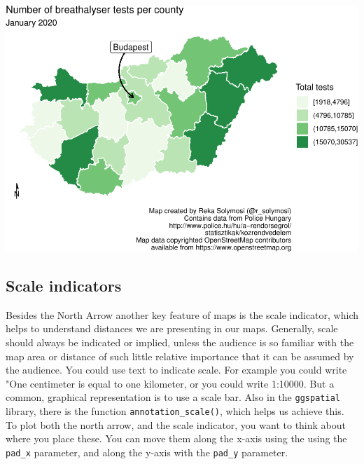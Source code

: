 \documentclass[
]{book}
\begin{document}
\includegraphics{crime_mapping_files/figure-latex/orientationarrowstyle-1.pdf}

\hypertarget{scale-indicators}{%
\subsection{Scale indicators}\label{scale-indicators}}

Besides the North Arrow another key feature of maps is the scale indicator, which helps to understand distances we are presenting in our maps. Generally, scale should always be indicated or implied, unless the audience is so familiar with the map area or distance of such little relative importance that it can be assumed by the audience. You could use text to indicate scale. For example you could write "One centimeter is equal to one kilometer, or you could write 1:10000. But a common, graphical representation is to use a scale bar. Also in the \texttt{ggspatial} library, there is the function \texttt{annotation\_scale()}, which helps us achieve this. To plot both the north arrow, and the scale indicator, you want to think about where you place these. You can move them along the x-axis using the using the \texttt{pad\_x} parameter, and along the y-axis with the \texttt{pad\_y} parameter.
\end{document}
